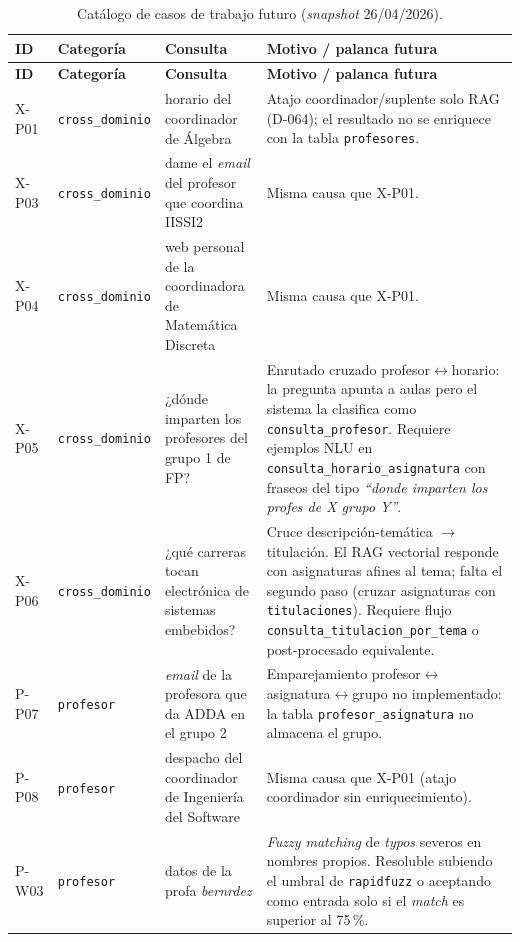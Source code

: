 {\small
\begin{longtable}{|>{\raggedright\arraybackslash}p{1.1cm}|>{\raggedright\arraybackslash}p{2.7cm}|>{\raggedright\arraybackslash}p{4.2cm}|>{\raggedright\arraybackslash}p{5.0cm}|}
\caption{Catálogo de casos de trabajo futuro (\textit{snapshot} 26/04/2026).}\label{tab:trabajo-futuro} \\
\hline
\textbf{ID} & \textbf{Categoría} & \textbf{Consulta} & \textbf{Motivo / palanca futura} \\ \hline
\endfirsthead
\hline
\textbf{ID} & \textbf{Categoría} & \textbf{Consulta} & \textbf{Motivo / palanca futura} \\ \hline
\endhead
X-P01 & \texttt{cross\_dominio} & horario del coordinador de Álgebra & Atajo coordinador/suplente solo RAG (D-064); el resultado no se enriquece con la tabla \texttt{profesores}. \\ \hline
X-P03 & \texttt{cross\_dominio} & dame el \textit{email} del profesor que coordina IISSI2 & Misma causa que X-P01. \\ \hline
X-P04 & \texttt{cross\_dominio} & web personal de la coordinadora de Matemática Discreta & Misma causa que X-P01. \\ \hline
X-P05 & \texttt{cross\_dominio} & ¿dónde imparten los profesores del grupo 1 de FP? & Enrutado cruzado profesor$\leftrightarrow$horario: la pregunta apunta a aulas pero el sistema la clasifica como \texttt{consulta\_profesor}. Requiere ejemplos NLU en \texttt{consulta\_horario\_asignatura} con fraseos del tipo \textit{``donde imparten los profes de X grupo Y''}. \\ \hline
X-P06 & \texttt{cross\_dominio} & ¿qué carreras tocan electrónica de sistemas embebidos? & Cruce descripción-temática $\rightarrow$ titulación. El RAG vectorial responde con asignaturas afines al tema; falta el segundo paso (cruzar asignaturas con \texttt{titulaciones}). Requiere flujo \texttt{consulta\_titulacion\_por\_tema} o post-procesado equivalente. \\ \hline
P-P07 & \texttt{profesor} & \textit{email} de la profesora que da ADDA en el grupo 2 & Emparejamiento profesor$\leftrightarrow$asignatura$\leftrightarrow$grupo no implementado: la tabla \texttt{profesor\_asignatura} no almacena el grupo. \\ \hline
P-P08 & \texttt{profesor} & despacho del coordinador de Ingeniería del Software & Misma causa que X-P01 (atajo coordinador sin enriquecimiento). \\ \hline
P-W03 & \texttt{profesor} & datos de la profa \textit{bernrdez} & \textit{Fuzzy matching} de \textit{typos} severos en nombres propios. Resoluble subiendo el umbral de \texttt{rapidfuzz} o aceptando como entrada solo si el \textit{match} es superior al 75\,\%. \\ \hline

\end{longtable}}
